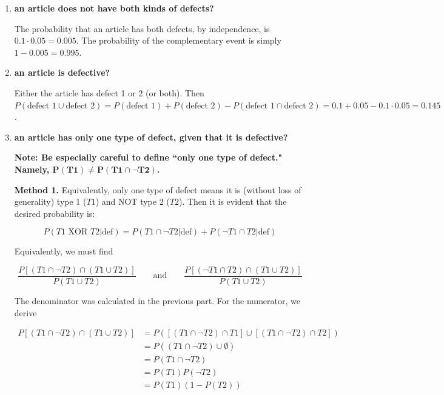 \documentclass[10pt, oneside]{article}
\begin{document}
\begin{enumerate}[label=3.\arabic*]
	\begin{enumerate}
	\item  \begin{tcolorbox}[
	  colback=Cerulean!5!white,
	  colframe=Cerulean!75!black]
	\textbf{an article does not have both kinds of defects?}
	\end{tcolorbox}
	
	The probability that an article has both defects, by independence, is $0.1 \cdot 0.05 = 0.005$. The probability of the complementary event is simply $1 - 0.005 = \boxed{0.995}$.
	
	\item  \begin{tcolorbox}[
	  colback=Cerulean!5!white,
	  colframe=Cerulean!75!black]
	\textbf{an article is defective?}
	\end{tcolorbox}
	
	Either the article has defect 1 or 2 (or both). Then $P(\text{defect 1} \cup \text{defect 2}) = P(\text{defect 1}) + P(\text{defect 2}) - P(\text{defect 1} \cap \text{defect 2}) = 0.1 + 0.05 - 0.1 \cdot 0.05 = \boxed{0.145}$.
	
	\item  \begin{tcolorbox}[
	  colback=Cerulean!5!white,
	  colframe=Cerulean!75!black]
	\textbf{an article has only one type of defect, given that it is defective?}
	\end{tcolorbox}
	
	\textbf{Note: Be especially careful to define ``only one type of defect." Namely, $\bm{P(T1) \neq P(T1 \cap \neg T2)}$.}
	
	\textbf{Method 1.} Equivalently, only one type of defect means it is (without loss of generality) type 1 ($T1$) and NOT type 2 ($T2$). Then it is evident that the desired probability is:
	
	\[ P(T1 \text{ XOR } T2 | \text{def}) = P(T1 \cap \neg T2 | \text{def}) + P(\neg T1 \cap T2 | \text{def}) \]
	
	Equivalently, we must find
	
	\[ \frac{P [ (T1 \cap \neg T2) \cap (T1 \cup T2) ]}{P(T1 \cup T2)} \qquad \text{and} \qquad \frac{P [ (\neg T1 \cap T2) \cap (T1 \cup T2) ]}{P(T1 \cup T2)}  \]
	
	The denominator was calculated in the previous part. For the numerator, we derive
	
	\begin{align*}
	P [ (T1 \cap \neg T2) \cap (T1 \cup T2) ] &= P([ (T1 \cap \neg T2) \cap T1 ] \cup [(T1 \cap \neg T2) \cap T2]) \\
	&= P( (T1 \cap \neg T2) \cup \emptyset) \\
	&= P(T1 \cap \neg T2) \\
	&= P(T1)P(\neg T2) \\
	&= P(T1)(1 - P(T2))
	\end{align*}
	

\end{enumerate}
\end{enumerate}
\end{document}
